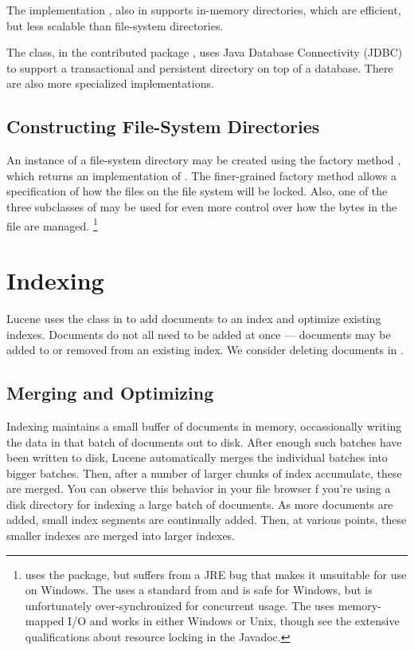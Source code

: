 The implementation , also in
 supports in-memory directories, which are efficient, but
less scalable than file-system directories.  

The 
class, in the contributed package ,
uses Java Database Connectivity (JDBC) to support a transactional and
persistent directory on top of a database.  There are also more
specialized implementations.

\subsection{Constructing File-System Directories}

An instance of a file-system directory may be created using the
factory method , which returns an
implementation of .  The finer-grained factory
method  allows a specification of how the
files on the file system will be locked.  Also, one of the three
subclasses of  may be used for even more control
over how the bytes in the file are managed.%
%
\footnote{ uses the  package, but
  suffers from a JRE bug that makes it unsuitable for use on Windows.
  The  uses a standard 
  from  and is safe for Windows, but is unfortunately
  over-synchronized for concurrent usage.  The 
  uses memory-mapped I/O and works in either Windows or Unix, though
  see the extensive qualifications about resource locking in the
  Javadoc.}


\section{Indexing}

Lucene uses the  class in
 to add documents to an index and
optimize existing indexes.  Documents do not all need to be added at
once --- documents may be added to or removed from an existing index.
We consider deleting documents in .

\subsection{Merging and Optimizing}

Indexing maintains a small buffer of documents in memory,
occassionally writing the data in that batch of documents out to disk.
After enough such batches have been written to disk, Lucene
automatically merges the individual batches into bigger batches.
Then, after a number of larger chunks of index accumulate, these are
merged.  You can observe this behavior in your file browser f you're
using a disk directory for indexing a large batch of documents.  As
more documents are added, small index segments are continually added.
Then, at various points, these smaller indexes are merged into larger
indexes.

